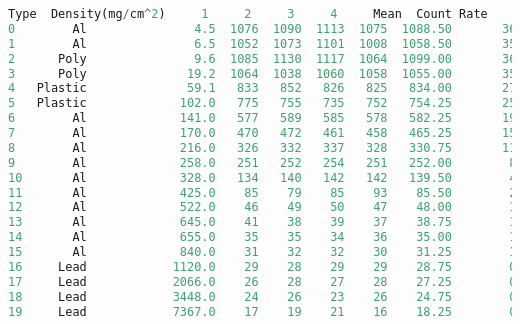 \documentclass[a4paper,11pt]{article}
\begin{document}
\begin{lstlisting}[language=Python]
       Type  Density(mg/cm^2)     1     2     3     4     Mean  Count Rate
0        Al               4.5  1076  1090  1113  1075  1088.50       36.28
1        Al               6.5  1052  1073  1101  1008  1058.50       35.28
2      Poly               9.6  1085  1130  1117  1064  1099.00       36.63
3      Poly              19.2  1064  1038  1060  1058  1055.00       35.17
4   Plastic              59.1   833   852   826   825   834.00       27.80
5   Plastic             102.0   775   755   735   752   754.25       25.14
6        Al             141.0   577   589   585   578   582.25       19.41
7        Al             170.0   470   472   461   458   465.25       15.51
8        Al             216.0   326   332   337   328   330.75       11.02
9        Al             258.0   251   252   254   251   252.00        8.40
10       Al             328.0   134   140   142   142   139.50        4.65
11       Al             425.0    85    79    85    93    85.50        2.85
12       Al             522.0    46    49    50    47    48.00        1.60
13       Al             645.0    41    38    39    37    38.75        1.29
14       Al             655.0    35    35    34    36    35.00        1.17
15       Al             840.0    31    32    32    30    31.25        1.04
16     Lead            1120.0    29    28    29    29    28.75        0.96
17     Lead            2066.0    26    28    27    28    27.25        0.91
18     Lead            3448.0    24    26    23    26    24.75        0.82
19     Lead            7367.0    17    19    21    16    18.25        0.61
\end{lstlisting}
\newpage
\noindent{}
\end{document}
